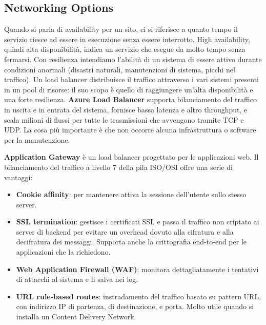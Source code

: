 \subsection{Networking Options}
Quando si parla di availability per un sito, ci si riferisce a quanto tempo il servizio riesce ad essere in esecuzione senza essere interrotto. High availability, quindi alta disponibilità, indica un servizio che esegue da molto tempo senza fermarsi. Con resilienza intendiamo l'abilità di un sistema di essere attivo durante condizioni anormali (disastri naturali, manutenzioni di sistema, picchi nel traffico). Un load balancer distribuisce il traffico attraverso i vari sistemi presenti in un pool di risorse: il suo scopo è quello di raggiungere un'alta disponibilità e una forte resilienza. \textbf{Azure Load Balancer} supporta bilanciamento del traffico in uscita e in entrata del sistema, fornisce bassa latenza e altro throughput, e scala milioni di flussi per tutte le trasmissioni che avvengono tramite TCP e UDP. La cosa più importante è che non occorre alcuna infrastruttura o software per la manutenzione.

\textbf{Application Gateway} è un load balancer progettato per le applicazioni web. Il bilanciamento del traffico a livello 7 della pila ISO/OSI offre una serie di vantaggi:
\begin{itemize}
    \item \textbf{Cookie affinity}: per mantenere attiva la sessione dell'utente sullo stesso server.
    \item \textbf{SSL termination}: gestisce i certificati SSL e passa il traffico non criptato ai server di backend per evitare un overhead dovuto alla cifratura e alla decifratura dei messaggi. Supporta anche la crittografia end-to-end per le applicazioni che la richiedono.
    \item \textbf{Web Application Firewall (WAF)}: monitora dettagliatamente i tentativi di attacchi al sistema e li salva nei log.
    \item \textbf{URL rule-based routes}: instradamento del traffico basato su pattern URL, con indirizzo IP di partenza, di destinazione, e porta. Molto utile quando si installa un Content Delivery Network.
\end{itemize}

